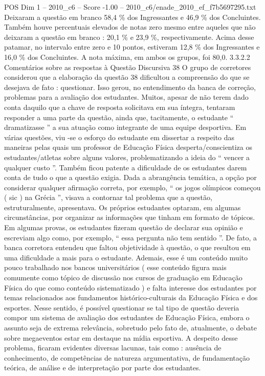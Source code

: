 \begin{textsample}{POS Dim 1 – 2010\_c6 – Score -1.00 – 2010\_c6/enade\_2010\_ef\_f7b5697295.txt}
Deixaram a questão em branco 58,4 \% dos Ingressantes e 46,9 \% dos Concluintes.
Também houve percentuais elevados de notas zero mesmo entre aqueles que não deixaram a questão em branco : 20,1 \% e 23,9 \%, respectivamente.
Acima desse patamar, no intervalo entre zero e 10 pontos, estiveram 12,8 \% dos Ingressantes e 16,0 \% dos Concluintes.
A nota máxima, em ambos os grupos, foi 80,0. 3.3.2.2 Comentários sobre as respostas à Questão Discursiva 38 O grupo de corretores considerou que a elaboração da questão 38 dificultou a compreensão do que se desejava de fato : questionar.
Isso gerou, no entendimento da banca de correção, problemas para a avaliação dos estudantes.
Muitos, apesar de não terem dado conta daquilo que a chave de resposta solicitava em sua íntegra, tentaram responder a uma parte da questão, ainda que, tacitamente, o estudante “ dramatizasse ” a sua atuação como integrante de uma equipe desportiva.
Em várias questões, viu -se o esforço do estudante em dissertar a respeito das maneiras pelas quais um professor de Educação Física desperta/conscientiza os estudantes/atletas sobre alguns valores, problematizando a ideia do “ vencer a qualquer custo ”.
Também ficou patente a dificuldade de os estudantes darem conta de tudo o que a questão exigia.
Dada a abrangência temática, a opção por considerar qualquer afirmação correta, por exemplo, “ os jogos olímpicos começou ( sic ) na Grécia ”, visava a contornar tal problema que a questão, estruturalmente, apresentava.
Os próprios estudantes optaram, em algumas circunstâncias, por organizar as informações que tinham em formato de tópicos.
Em algumas provas, os estudantes fizeram questão de declarar sua opinião e escreviam algo como, por exemplo, “ essa pergunta não tem sentido ”.
De fato, a banca corretora entendeu que faltou objetividade à questão, o que resultou em uma dificuldade a mais para o estudante.
Ademais, esse é um conteúdo muito pouco trabalhado nos bancos universitários ( esse conteúdo figura mais comumente como tópico de discussão nos cursos de graduação em Educação Física do que como conteúdo sistematizado ) e falta interesse dos estudantes por temas relacionados aos fundamentos histórico-culturais da Educação Física e dos esportes.
Nesse sentido, é possível questionar se tal tipo de questão deveria compor um sistema de avaliação dos estudantes de Educação Física, embora o assunto seja de extrema relevância, sobretudo pelo fato de, atualmente, o debate sobre megaeventos estar em destaque na mídia esportiva.
A despeito desse problema, ficaram evidentes diversas lacunas, tais como : ausência de conhecimento, de competências de natureza argumentativa, de fundamentação teórica, de análise e de interpretação por parte dos estudantes.

\end{textsample}
